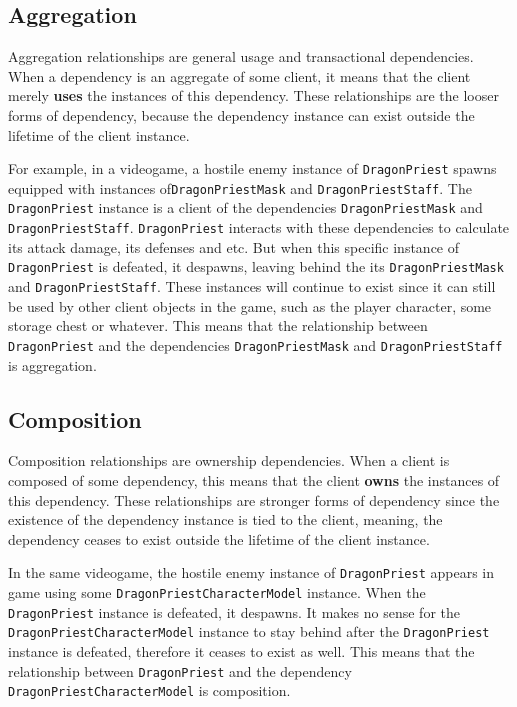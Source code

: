 \subsection{Aggregation}\label{class-relationships.md__aggregation}

Aggregation relationships are general usage and transactional
dependencies. When a dependency is an aggregate of some client, it means
that the client merely \textbf{uses} the instances of this dependency.
These relationships are the looser forms of dependency, because the
dependency instance can exist outside the lifetime of the client
instance.

For example, in a videogame, a hostile enemy instance of
\texttt{DragonPriest} spawns equipped with instances
of\texttt{DragonPriestMask} and \texttt{DragonPriestStaff}. The
\texttt{DragonPriest} instance is a client of the dependencies
\texttt{DragonPriestMask} and \texttt{DragonPriestStaff}.
\texttt{DragonPriest} interacts with these dependencies to calculate its
attack damage, its defenses and etc. But when this specific instance of
\texttt{DragonPriest} is defeated, it despawns, leaving behind the its
\texttt{DragonPriestMask} and \texttt{DragonPriestStaff}. These
instances will continue to exist since it can still be used by other
client objects in the game, such as the player character, some storage
chest or whatever. This means that the relationship between
\texttt{DragonPriest} and the dependencies \texttt{DragonPriestMask} and
\texttt{DragonPriestStaff} is aggregation.

\subsection{Composition}\label{class-relationships.md__composition}

Composition relationships are ownership dependencies. When a client is
composed of some dependency, this means that the client \textbf{owns}
the instances of this dependency. These relationships are stronger forms
of dependency since the existence of the dependency instance is tied to
the client, meaning, the dependency ceases to exist outside the lifetime
of the client instance.

In the same videogame, the hostile enemy instance of
\texttt{DragonPriest} appears in game using some
\texttt{DragonPriestCharacterModel} instance. When the
\texttt{DragonPriest} instance is defeated, it despawns. It makes no
sense for the \texttt{DragonPriestCharacterModel} instance to stay
behind after the \texttt{DragonPriest} instance is defeated, therefore
it ceases to exist as well. This means that the relationship between
\texttt{DragonPriest} and the dependency
\texttt{DragonPriestCharacterModel} is composition.


